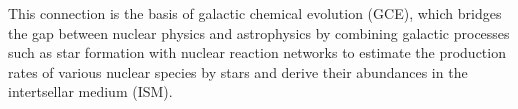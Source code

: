 \documentclass[ms.tex]{subfiles}
\begin{document}
\par
This connection is the basis of galactic chemical evolution (GCE), which
bridges the gap between nuclear physics and astrophysics by combining galactic
processes such as star formation with nuclear reaction networks to estimate the
production rates of various nuclear species by stars and derive their
abundances in the intertsellar medium (ISM).
\end{document}
